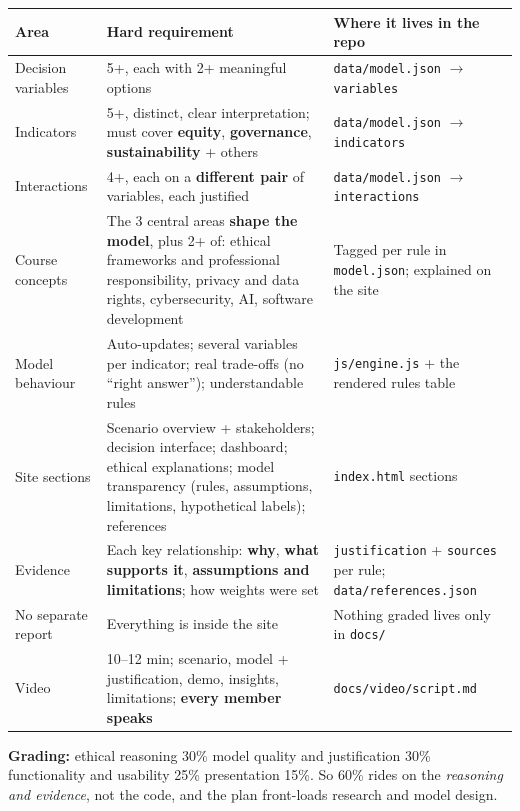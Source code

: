 \documentclass[11pt,a4paper]{article}
\newcommand{\code}[1]{\texttt{#1}}
\begin{document}
\begin{tabularx}{\textwidth}{@{}p{3.1cm}LL@{}}
\toprule
\textbf{Area} & \textbf{Hard requirement} & \textbf{Where it lives in the repo} \\
\midrule
Decision variables & 5+, each with 2+ meaningful options & \code{data/model.json} $\rightarrow$ \code{variables} \\
Indicators & 5+, distinct, clear interpretation; must cover \textbf{equity}, \textbf{governance}, \textbf{sustainability} + others & \code{data/model.json} $\rightarrow$ \code{indicators} \\
Interactions & 4+, each on a \textbf{different pair} of variables, each justified & \code{data/model.json} $\rightarrow$ \code{interactions} \\
Course concepts & The 3 central areas \textbf{shape the model}, plus 2+ of: ethical frameworks and professional responsibility, privacy and data rights, cybersecurity, AI, software development & Tagged per rule in \code{model.json}; explained on the site \\
Model behaviour & Auto-updates; several variables per indicator; real trade-offs (no ``right answer''); understandable rules & \code{js/engine.js} + the rendered rules table \\
Site sections & Scenario overview + stakeholders; decision interface; dashboard; ethical explanations; model transparency (rules, assumptions, limitations, hypothetical labels); references & \code{index.html} sections \\
Evidence & Each key relationship: \textbf{why}, \textbf{what supports it}, \textbf{assumptions and limitations}; how weights were set & \code{justification} + \code{sources} per rule; \code{data/references.json} \\
No separate report & Everything is inside the site & Nothing graded lives only in \code{docs/} \\
Video & 10--12 min; scenario, model + justification, demo, insights, limitations; \textbf{every member speaks} & \code{docs/video/script.md} \\
\bottomrule
\end{tabularx}

\textbf{Grading:} ethical reasoning 30\% \textperiodcentered{} model quality and justification 30\%
\textperiodcentered{} functionality and usability 25\% \textperiodcentered{} presentation 15\%.
So 60\% rides on the \emph{reasoning and evidence}, not the code, and the plan front-loads research
and model design.
\end{document}
